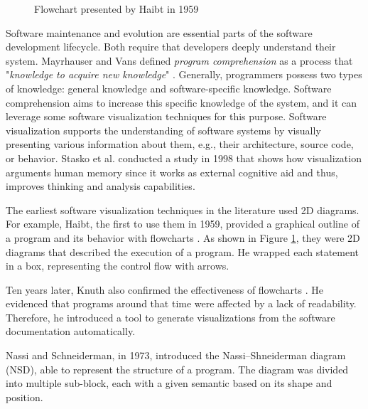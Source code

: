\begin{figure}
  \caption{Flowchart presented by Haibt in 1959}
  \label{fig:Haibt1959_Flowchart}

\end{figure}

Software maintenance and evolution are essential parts of the software development lifecycle. Both require that developers deeply understand their system. 
Mayrhauser and Vans defined {\it program comprehension} as a process that "{\it knowledge to acquire new knowledge}" \cite{VonMayrhauser1995}. 
Generally, programmers possess two types of knowledge: general knowledge and software-specific knowledge. 
Software comprehension aims to increase this specific knowledge of the system, and it can leverage some software visualization techniques for this purpose. 
Software visualization supports the understanding of software systems
by visually presenting various information about them, e.g., their architecture, source code, or behavior.
Stasko et al.\cite{Stasko2008} conducted a study in 1998 that shows how visualization arguments human memory since 
it works as external cognitive aid and thus, improves thinking and analysis capabilities.



\bigbreak

The earliest software visualization techniques in the literature used 2D diagrams. 
For example, Haibt, the first to use them in 1959, provided a graphical outline of a program and its behavior with flowcharts \cite{Haibt1959}. 
As shown in Figure \ref{fig:Haibt1959_Flowchart}, they were 2D diagrams that described the execution of a program.
He wrapped each statement in a box, representing the control flow with arrows.

 \bigbreak
Ten years later, Knuth also confirmed the effectiveness of flowcharts \cite{Knuth1963}. 
He evidenced that programs around that time were affected by a lack of readability.
Therefore, he introduced a tool to generate visualizations from the software documentation automatically.

\bigbreak
Nassi and Schneiderman\cite{Nassi1973}, in 1973, introduced the Nassi–Shneiderman diagram (NSD), able to represent the structure of a program. 
The diagram was divided into multiple sub-block, each with a given semantic based on its shape and position. 

